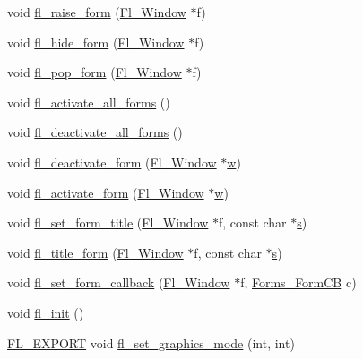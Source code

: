 \begin{DoxyCompactItemize}
\item 
void \hyperlink{forms_8_h_a5c7763f7fb1c357de1edf169da1cd655}{fl\+\_\+raise\+\_\+form} (\hyperlink{class_fl___window}{Fl\+\_\+\+Window} $\ast$f)
\item 
void \hyperlink{forms_8_h_a64225f30ccb8408b687890a1a2167af2}{fl\+\_\+hide\+\_\+form} (\hyperlink{class_fl___window}{Fl\+\_\+\+Window} $\ast$f)
\item 
void \hyperlink{forms_8_h_ac614eea9fea515d6d03ef1706bfa524c}{fl\+\_\+pop\+\_\+form} (\hyperlink{class_fl___window}{Fl\+\_\+\+Window} $\ast$f)
\item 
void \hyperlink{forms_8_h_aecec6b67299f0239f2f9355ff6cebc88}{fl\+\_\+activate\+\_\+all\+\_\+forms} ()
\item 
void \hyperlink{forms_8_h_a42070578560b5bbad950e6488de10846}{fl\+\_\+deactivate\+\_\+all\+\_\+forms} ()
\item 
void \hyperlink{forms_8_h_a31e0054769801d9489bd270d13e2856d}{fl\+\_\+deactivate\+\_\+form} (\hyperlink{class_fl___window}{Fl\+\_\+\+Window} $\ast$\hyperlink{forms_8_h_aac374e320caaadeca4874add33b62af2}{w})
\item 
void \hyperlink{forms_8_h_a58da1b914a1d3b976b614584a96562fa}{fl\+\_\+activate\+\_\+form} (\hyperlink{class_fl___window}{Fl\+\_\+\+Window} $\ast$\hyperlink{forms_8_h_aac374e320caaadeca4874add33b62af2}{w})
\item 
void \hyperlink{forms_8_h_a8536b922111272533aa54952491683ba}{fl\+\_\+set\+\_\+form\+\_\+title} (\hyperlink{class_fl___window}{Fl\+\_\+\+Window} $\ast$f, const char $\ast$\hyperlink{forms_8_h_a672b4f0a8c8a6db61068c721f799d87f}{s})
\item 
void \hyperlink{forms_8_h_a5ccbad656da3d8012a257c8fa1da3e67}{fl\+\_\+title\+\_\+form} (\hyperlink{class_fl___window}{Fl\+\_\+\+Window} $\ast$f, const char $\ast$\hyperlink{forms_8_h_a672b4f0a8c8a6db61068c721f799d87f}{s})
\item 
void \hyperlink{forms_8_h_a967f084644d6c1d984d99b4f6d1ad388}{fl\+\_\+set\+\_\+form\+\_\+callback} (\hyperlink{class_fl___window}{Fl\+\_\+\+Window} $\ast$f, \hyperlink{forms_8_h_ad97f38473f6f13b5ab389030a4c8887c}{Forms\+\_\+\+Form\+CB} c)
\item 
void \hyperlink{forms_8_h_a7551a12cea666db06a354e71f92b48cf}{fl\+\_\+init} ()
\item 
\hyperlink{_fl___export_8_h_aa9ba29a18aee9d738370a06eeb4470fc}{F\+L\+\_\+\+E\+X\+P\+O\+RT} void \hyperlink{forms_8_h_a6c58c1af7c202464ea8d770293f3aca4}{fl\+\_\+set\+\_\+graphics\+\_\+mode} (int, int)
\item 

\end{DoxyCompactItemize}
